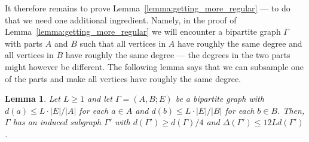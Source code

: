 \documentclass[10pt, a4paper]{article}
\numberwithin{theorem}{section} %
\newtheorem{lemma}[theorem]{Lemma}
\theoremstyle{remark}
\theoremstyle{definition}
\begin{document}
It therefore remains to prove Lemma~\ref{lemma:getting_more_regular} --- to do that we need one additional ingredient.
Namely, in the proof of Lemma~\ref{lemma:getting_more_regular} we will encounter a bipartite graph $\Gamma$ with parts $A$ and $B$ such that all vertices in $A$ have roughly the same degree and all vertices in $B$ have roughly the same degree --- the degrees in the two parts might however be different.
The following lemma says that we can subsample one of the parts and make all vertices have roughly the same degree.
\begin{lemma}\label{lemma:subsampling_biregular}
    Let $L \geq 1$ and let $\Gamma = (A, B; E)$ be a bipartite graph with $d(a) \leq L \cdot |E| / |A|$ for each $a \in A$ and $d(b) \leq L \cdot |E|/ |B|$ for each $b\in B$. 
    Then, $\Gamma$ has an induced subgraph $\Gamma'$ with $d(\Gamma') \geq d(\Gamma)/4$ and $\Delta(\Gamma') \leq 12Ld(\Gamma')$.
\end{lemma}
\end{document}
